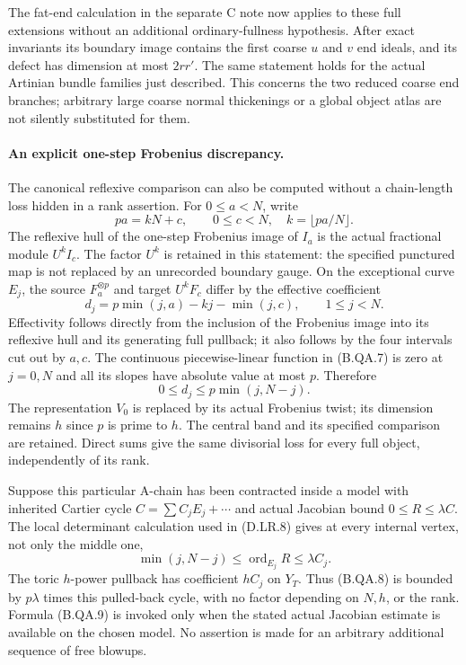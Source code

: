 The fat-end calculation in the separate C note now applies to these
full extensions without an additional ordinary-fullness hypothesis.
After exact invariants its boundary image contains the first coarse
$u$ and $v$ end ideals, and its defect has dimension at most $2rr'$.
The same statement holds for the actual Artinian bundle families just
described.  This concerns the two reduced coarse end branches; arbitrary
large coarse normal thickenings or a global object atlas are not
silently substituted for them.

\paragraph{An explicit one-step Frobenius discrepancy.}
The canonical reflexive comparison can also be computed without a
chain-length loss hidden in a rank assertion.  For $0\le a<N$, write
\[
                 pa=kN+c,\qquad0\le c<N,
                 \quad k=\lfloor pa/N\rfloor.
\]
The reflexive hull of the one-step Frobenius image of $I_a$ is the
actual fractional module $U^k I_c$.  The factor $U^k$ is retained in
this statement: the specified punctured map is not replaced by an
unrecorded boundary gauge.  On the exceptional curve $E_j$, the source
$F_a^{\otimes p}$ and target $U^kF_c$ differ by the effective coefficient
\[
       d_j=p\min(j,a)-kj-\min(j,c),\qquad1\le j<N.      \tag{B.QA.7}
\]
Effectivity follows directly from the inclusion of the Frobenius image
into its reflexive hull and its generating full pullback; it also
follows by the four intervals cut out by $a,c$.  The continuous
piecewise-linear function in (B.QA.7) is zero at $j=0,N$ and all its
slopes have absolute value at most $p$.  Therefore
\[
                         0\le d_j\le p\min(j,N-j).     \tag{B.QA.8}
\]
The representation $V_0$ is replaced by its actual Frobenius twist;
its dimension remains $h$ since $p$ is prime to $h$.  The central band
and its specified comparison are retained.  Direct sums give the same
divisorial loss for every full object, independently of its rank.

Suppose this particular A-chain has been contracted inside a model
with inherited Cartier cycle $C=\sum C_jE_j+\cdots$ and actual Jacobian
bound $0\le R\le\lambda C$.  The local determinant calculation used
in (D.LR.8) gives at every internal vertex, not only the middle one,
\[
        \min(j,N-j)\le \operatorname{ord}_{E_j}R
                                      \le\lambda C_j. \tag{B.QA.9}
\]
The toric $h$-power pullback has coefficient $hC_j$ on $Y_T$.
Thus (B.QA.8) is bounded by $p\lambda$ times this pulled-back cycle,
with no factor depending on $N,h$, or the rank.  Formula (B.QA.9) is
invoked only when the stated actual Jacobian estimate is available on
the chosen model.  No assertion is made for an arbitrary additional
sequence of free blowups.

